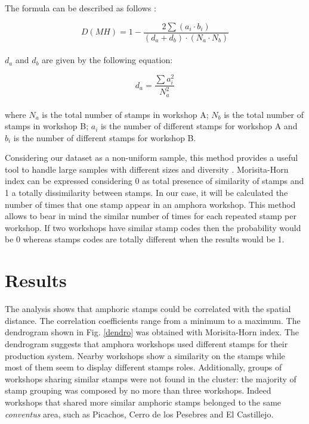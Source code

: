 \documentclass[review]{elsarticle}
\begin{document}
The formula can be described as follows \citep{magurran_measuring_2013}:

\begin{equation}
D(MH) = 1- \frac{2 \sum(a_{i} \cdot b_{i})}{(d_{a} + d_{b}) \cdot (N_{a} \cdot N_{b})}
\end{equation} \\

$d_{a}$ and $d_{b}$ are given by the following equation:

\begin{equation}
d_{a} = \frac{\sum a_{i}^{2}}{N_{a}^{2}} 
\end{equation} \\

where $N_{a}$ is the total number of stamps in workshop A; $N_{b}$ is the total number of stamps in workshop B; $a_{i}$ is the number of different stamps for workshop A and $b_{i}$ is the number of different stamps for workshop B.

Considering our dataset as a non-uniform sample, this method provides a useful tool to handle large samples with different sizes and diversity \citep{wolda_similarity_1981}. Morisita-Horn index can be expressed considering 0 as total presence of similarity of stamps and 1 a totally dissimilarity between stamps. In our case, it will be calculated the number of times that one stamp appear in an amphora workshop. This method allows to bear in mind the similar number of times for each repeated stamp per workshop. If two workshops have similar stamp codes then the probability would be 0 whereas stamps codes are totally different when the results would be 1. 


\section{Results}

The analysis shows that amphoric stamps could be correlated with the spatial distance. The correlation coefficients range from a minimum to a maximum. The dendrogram shown in Fig. \ref{dendro} was obtained with Morisita-Horn index. The dendrogram suggests that amphora workshops used different stamps for their production system. Nearby workshops show a similarity on the stamps while most of them seem to display different stamps roles. Additionally, groups of workshops sharing similar stamps were not found in the cluster: the majority of stamp grouping was composed by no more than three workshops. Indeed workshops that shared more similar amphoric stamps belonged to the same \textit{conventus} area, such as Picachos, Cerro de los Pesebres and El Castillejo. 
\end{document}
